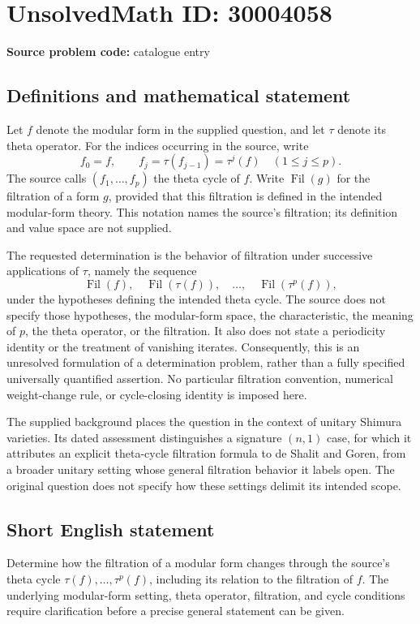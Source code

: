 \documentclass[11pt]{article}
\begin{document}
\section*{UnsolvedMath ID: 30004058}
\textbf{Source problem code:} catalogue entry
\subsection{Definitions and mathematical statement}
Let \(f\) denote the modular form in the supplied question, and let \(\tau\) denote its theta operator. For the indices occurring in the source, write
\[
f_0=f,\qquad f_j=\tau(f_{j-1})=\tau^j(f)\quad(1\leq j\leq p).
\]
The source calls \((f_1,\ldots,f_p)\) the theta cycle of \(f\). Write \(\operatorname{Fil}(g)\) for the filtration of a form \(g\), provided that this filtration is defined in the intended modular-form theory. This notation names the source's filtration; its definition and value space are not supplied.

The requested determination is the behavior of filtration under successive applications of \(\tau\), namely the sequence
\[
\operatorname{Fil}(f),\quad
\operatorname{Fil}(\tau(f)),\quad\ldots,\quad
\operatorname{Fil}(\tau^p(f)),
\]
under the hypotheses defining the intended theta cycle. The source does not specify those hypotheses, the modular-form space, the characteristic, the meaning of \(p\), the theta operator, or the filtration. It also does not state a periodicity identity or the treatment of vanishing iterates. Consequently, this is an unresolved formulation of a determination problem, rather than a fully specified universally quantified assertion. No particular filtration convention, numerical weight-change rule, or cycle-closing identity is imposed here.

The supplied background places the question in the context of unitary Shimura varieties. Its dated assessment distinguishes a signature \((n,1)\) case, for which it attributes an explicit theta-cycle filtration formula to de Shalit and Goren, from a broader unitary setting whose general filtration behavior it labels open. The original question does not specify how these settings delimit its intended scope.
\subsection{Short English statement}
Determine how the filtration of a modular form changes through the source's theta cycle \(\tau(f),\ldots,\tau^p(f)\), including its relation to the filtration of \(f\). The underlying modular-form setting, theta operator, filtration, and cycle conditions require clarification before a precise general statement can be given.
\end{document}

